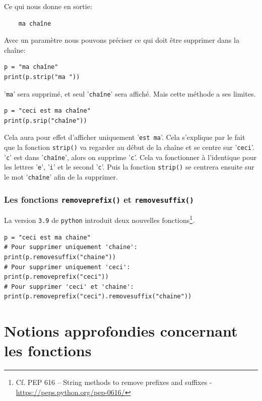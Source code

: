 \documentclass[a4paper,12pt]{book}
\begin{document}
Ce qui nous donne en sortie:
\begin{verbatim}
    ma chaîne
\end{verbatim}
\medskip

Avec un paramètre nous pouvons préciser ce qui doit être supprimer dans la chaîne:
\begin{lstlisting}
p = "ma chaîne"
print(p.strip("ma "))
\end{lstlisting}
\medskip

'\texttt{ma}' sera supprimé, et seul '\texttt{chaîne}' sera affiché. Mais cette méthode a ses limites.
\begin{lstlisting}
p = "ceci est ma chaîne"
print(p.srip("chaîne"))
\end{lstlisting}
\medskip

Cela aura pour effet d'afficher uniquement '\texttt{est ma}'. Cela s'explique par le fait que la fonction \texttt{strip()} va regarder au début de la chaîne et se centre sur '\texttt{ceci}'. '\texttt{c}' est dans '\texttt{chaîne}', alors on supprime '\texttt{c}'. Cela va fonctionner à l'identique pour les lettres '\texttt{e}', '\texttt{i}' et le second '\texttt{c}'. Puis la fonction \texttt{strip()} se centrera ensuite sur le mot '\texttt{chaîne}' afin de la supprimer.
\medskip

\subsection*{Les fonctions \texttt{removeprefix()} et \texttt{removesuffix()}}\label{prefix_suffix}
La version \texttt{3.9} de \texttt{python} introduit deux nouvelles fonctions\footnote{Cf. PEP 616 – String methods to remove prefixes and suffixes - \url{https://peps.python.org/pep-0616/}}.
\begin{lstlisting}
p = "ceci est ma chaine"
# Pour supprimer uniquement 'chaine':
print(p.removesuffix("chaine"))
# Pour supprimer uniquement 'ceci':
print(p.removeprefix("ceci"))
# Pour supprimer 'ceci' et 'chaine':
print(p.removeprefix("ceci").removesuffix("chaine"))
\end{lstlisting}
\medskip

\chapter{Notions approfondies concernant les fonctions}
\end{document}
